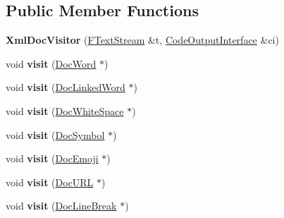 \subsection*{Public Member Functions}
\begin{DoxyCompactItemize}
\item 
\mbox{\label{class_xml_doc_visitor_a98b67fb17b406a4e5527764c3ab0568c}} 
{\bfseries Xml\+Doc\+Visitor} (\mbox{\hyperlink{class_f_text_stream}{F\+Text\+Stream}} \&t, \mbox{\hyperlink{class_code_output_interface}{Code\+Output\+Interface}} \&ci)
\item 
\mbox{\label{class_xml_doc_visitor_a1a09e474cba74f7a8ed902ce8c2ddb33}} 
void {\bfseries visit} (\mbox{\hyperlink{class_doc_word}{Doc\+Word}} $\ast$)
\item 
\mbox{\label{class_xml_doc_visitor_a48ba844db6d6701b26bfedb1cb9e8649}} 
void {\bfseries visit} (\mbox{\hyperlink{class_doc_linked_word}{Doc\+Linked\+Word}} $\ast$)
\item 
\mbox{\label{class_xml_doc_visitor_a49eeb551297981b25677252efd2784a8}} 
void {\bfseries visit} (\mbox{\hyperlink{class_doc_white_space}{Doc\+White\+Space}} $\ast$)
\item 
\mbox{\label{class_xml_doc_visitor_a5515884fb3aa00e1c5c7f649d82b7ab7}} 
void {\bfseries visit} (\mbox{\hyperlink{class_doc_symbol}{Doc\+Symbol}} $\ast$)
\item 
\mbox{\label{class_xml_doc_visitor_afeb7b4d7b82193108faa05cf2fed44e2}} 
void {\bfseries visit} (\mbox{\hyperlink{class_doc_emoji}{Doc\+Emoji}} $\ast$)
\item 
\mbox{\label{class_xml_doc_visitor_a7ea97d2a1bc209d4c38381bb0d56c523}} 
void {\bfseries visit} (\mbox{\hyperlink{class_doc_u_r_l}{Doc\+U\+RL}} $\ast$)
\item 
\mbox{\label{class_xml_doc_visitor_aa270bbaf630a50d79708ecd4384690a5}} 
void {\bfseries visit} (\mbox{\hyperlink{class_doc_line_break}{Doc\+Line\+Break}} $\ast$)
\item 
\mbox{\label{class_xml_doc_visitor_a309a6e37c650e4d3f54f3ca507e47b63}} 

\end{DoxyCompactItemize}
